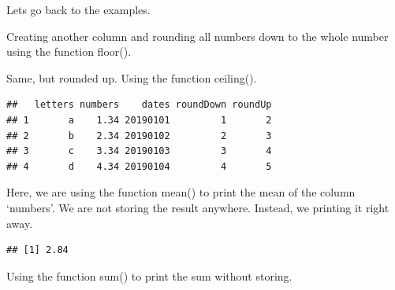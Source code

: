 \documentclass[]{book}
\newenvironment{Shaded}{\begin{snugshade}}{\end{snugshade}}
\newcommand{\CommentTok}[1]{\textcolor[rgb]{0.56,0.35,0.01}{\textit{#1}}}
\newcommand{\KeywordTok}[1]{\textcolor[rgb]{0.13,0.29,0.53}{\textbf{#1}}}
\newcommand{\NormalTok}[1]{#1}
\newcommand{\OperatorTok}[1]{\textcolor[rgb]{0.81,0.36,0.00}{\textbf{#1}}}
\newcommand{\StringTok}[1]{\textcolor[rgb]{0.31,0.60,0.02}{#1}}
\begin{document}
Lets go back to the examples.

Creating another column and rounding all numbers down to the whole number using the function floor().

\begin{Shaded}
\end{Shaded}

Same, but rounded up. Using the function ceiling().

\begin{Shaded}
\end{Shaded}

\begin{verbatim}
##   letters numbers    dates roundDown roundUp
## 1       a    1.34 20190101         1       2
## 2       b    2.34 20190102         2       3
## 3       c    3.34 20190103         3       4
## 4       d    4.34 20190104         4       5
\end{verbatim}

Here, we are using the function mean() to print the mean of the column `numbers'. We are not storing the result anywhere. Instead, we printing it right away.

\begin{Shaded}
\end{Shaded}

\begin{verbatim}
## [1] 2.84
\end{verbatim}

Using the function sum() to print the sum without storing.

\begin{Shaded}
\end{Shaded}
\end{document}
